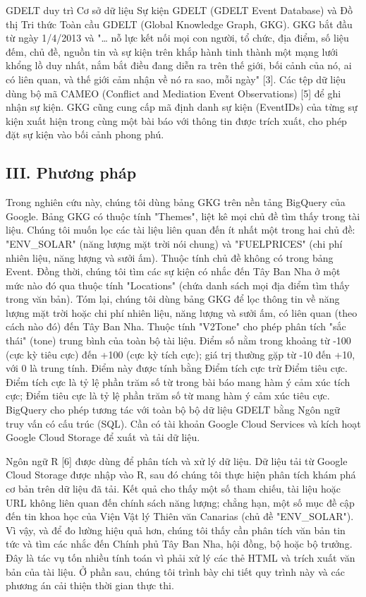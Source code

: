 GDELT duy trì Cơ sở dữ liệu Sự kiện GDELT (GDELT Event Database) và Đồ thị Tri thức Toàn cầu GDELT (Global Knowledge Graph, GKG). GKG bắt đầu từ ngày 1/4/2013 và "\ldots{} nỗ lực kết nối mọi con người, tổ chức, địa điểm, số liệu đếm, chủ đề, nguồn tin và sự kiện trên khắp hành tinh thành một mạng lưới khổng lồ duy nhất, nắm bắt điều đang diễn ra trên thế giới, bối cảnh của nó, ai có liên quan, và thế giới cảm nhận về nó ra sao, mỗi ngày" {[}3{]}. Các tệp dữ liệu dùng bộ mã CAMEO (Conflict and Mediation Event Observations) {[}5{]} để ghi nhận sự kiện. GKG cũng cung cấp mã định danh sự kiện (EventIDs) của từng sự kiện xuất hiện trong cùng một bài báo với thông tin được trích xuất, cho phép đặt sự kiện vào bối cảnh phong phú.

\subsection{III. Phương pháp}

Trong nghiên cứu này, chúng tôi dùng bảng GKG trên nền tảng BigQuery của Google. Bảng GKG có thuộc tính "Themes", liệt kê mọi chủ đề tìm thấy trong tài liệu. Chúng tôi muốn lọc các tài liệu liên quan đến ít nhất một trong hai chủ đề: "ENV\_SOLAR" (năng lượng mặt trời nói chung) và "FUELPRICES" (chi phí nhiên liệu, năng lượng và sưởi ấm). Thuộc tính chủ đề không có trong bảng Event. Đồng thời, chúng tôi tìm các sự kiện có nhắc đến Tây Ban Nha ở một mức nào đó qua thuộc tính "Locations" (chứa danh sách mọi địa điểm tìm thấy trong văn bản). Tóm lại, chúng tôi dùng bảng GKG để lọc thông tin về năng lượng mặt trời hoặc chi phí nhiên liệu, năng lượng và sưởi ấm, có liên quan (theo cách nào đó) đến Tây Ban Nha. Thuộc tính "V2Tone" cho phép phân tích "sắc thái" (tone) trung bình của toàn bộ tài liệu. Điểm số nằm trong khoảng từ -100 (cực kỳ tiêu cực) đến +100 (cực kỳ tích cực); giá trị thường gặp từ -10 đến +10, với 0 là trung tính. Điểm này được tính bằng Điểm tích cực trừ Điểm tiêu cực. Điểm tích cực là tỷ lệ phần trăm số từ trong bài báo mang hàm ý cảm xúc tích cực; Điểm tiêu cực là tỷ lệ phần trăm số từ mang hàm ý cảm xúc tiêu cực. BigQuery cho phép tương tác với toàn bộ bộ dữ liệu GDELT bằng Ngôn ngữ truy vấn có cấu trúc (SQL). Cần có tài khoản Google Cloud Services và kích hoạt Google Cloud Storage để xuất và tải dữ liệu.

Ngôn ngữ R {[}6{]} được dùng để phân tích và xử lý dữ liệu. Dữ liệu tải từ Google Cloud Storage được nhập vào R, sau đó chúng tôi thực hiện phân tích khám phá cơ bản trên dữ liệu đã tải. Kết quả cho thấy một số tham chiếu, tài liệu hoặc URL không liên quan đến chính sách năng lượng; chẳng hạn, một số mục đề cập đến tin khoa học của Viện Vật lý Thiên văn Canarias (chủ đề "ENV\_SOLAR"). Vì vậy, và để đo lường hiệu quả hơn, chúng tôi thấy cần phân tích văn bản tin tức và tìm các nhắc đến Chính phủ Tây Ban Nha, hội đồng, bộ hoặc bộ trưởng. Đây là tác vụ tốn nhiều tính toán vì phải xử lý các thẻ HTML và trích xuất văn bản của tài liệu. Ở phần sau, chúng tôi trình bày chi tiết quy trình này và các phương án cải thiện thời gian thực thi.

